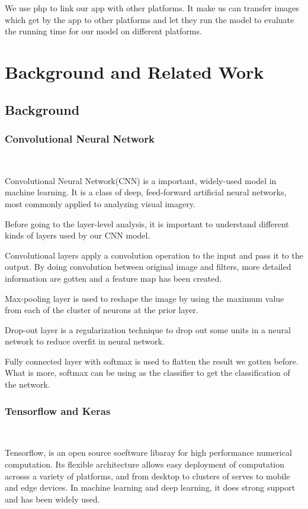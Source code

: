 \documentclass[conference]{IEEEtran}
\begin{document}
\textbullet We use php to link our app with other platforms. It make us can transfer images which get by the app to other platforms and let they run the model to evaluate the running time for our model on different platforms. 


\section{Background and Related Work}

\subsection{Background}

\subsubsection{Convolutional Neural Network}

\

\noindent
Convolutional Neural Network(CNN) is a important, widely-used model in machine learning. It is a class of deep, feed-forward artificial neural networks, most commonly applied to analyzing visual imagery. 

Before going to the layer-level analysis, it is important to understand different kinds of layers used by our CNN model. 

Convolutional layers apply a convolution operation to the input and pass it to the output. By doing convolution between original image and filters, more detailed information are gotten and a feature map has been created.

Max-pooling layer is used to reshape the image by using the maximum value from each of the cluster of neurons at the prior layer.

Drop-out layer is a regularization technique to drop out some units in a neural network to reduce overfit in neural network.

Fully connected layer with softmax is used to flatten the result we gotten before. What is more, softmax can be using as the classifier to get the classification of the network.


\subsubsection{Tensorflow and Keras}

\

\noindent

Tensorflow, is an open source soeftware libaray for high performance numerical computation. Its flexible architecture allows easy deployment of computation acrosss a variety of platforms, and from desktop to clusters of serves to mobile and edge devices. In machine learning and deep learning, it does strong support and has been widely used.
\end{document}
